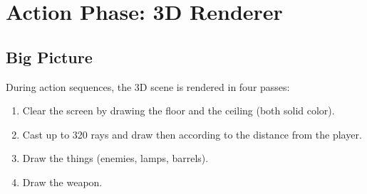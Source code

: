 \section{Action Phase: 3D Renderer}

\subsection{Big Picture}

During action sequences, the 3D scene is rendered in four passes:
\begin{enumerate}
 \item Clear the screen by drawing the floor and the ceiling (both solid color).
 \item Cast up to 320 rays and draw then according to the distance from the player.
 \item Draw the things (enemies, lamps, barrels).
 \item Draw the weapon.	
\end{enumerate}

